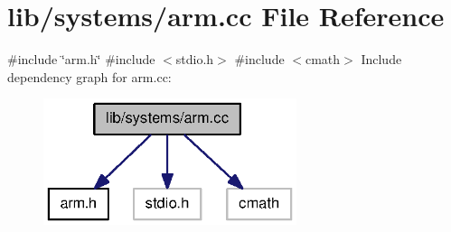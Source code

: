\section{lib/systems/arm.cc \-File \-Reference}
\label{arm_8cc}
{\ttfamily \#include \char`\"{}arm.\-h\char`\"{}}\*
{\ttfamily \#include $<$stdio.\-h$>$}\*
{\ttfamily \#include $<$cmath$>$}\*
\-Include dependency graph for arm.\-cc\-:\nopagebreak
\begin{figure}[H]
\begin{center}
\leavevmode
\includegraphics[width=210pt]{arm_8cc__incl}
\end{center}
\end{figure}
